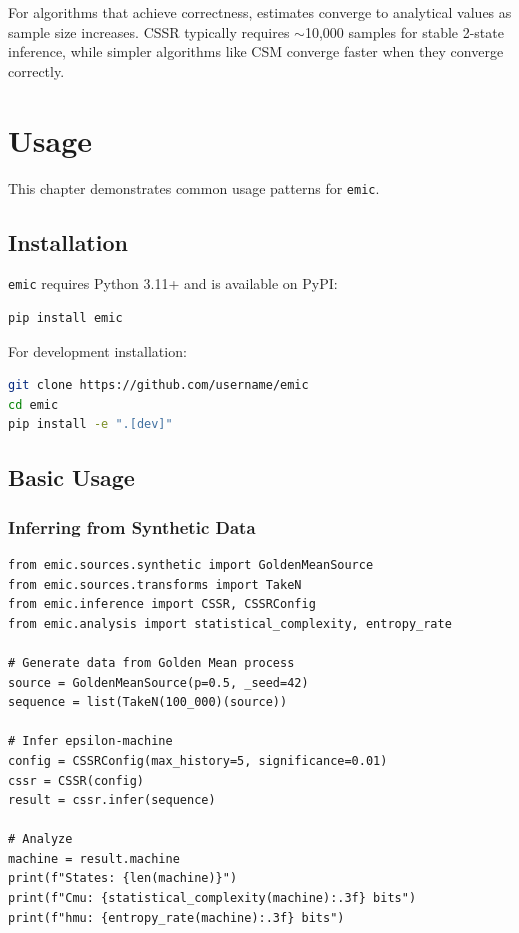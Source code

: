 \documentclass[11pt,a4paper]{report}
\theoremstyle{definition}
\theoremstyle{plain}
\newcommand{\emic}{\texttt{emic}}
\begin{document}
For algorithms that achieve correctness, estimates converge to analytical values as sample size increases. CSSR typically requires $\sim$10,000 samples for stable 2-state inference, while simpler algorithms like CSM converge faster when they converge correctly.

\chapter{Usage}
\label{ch:usage}

This chapter demonstrates common usage patterns for \emic{}.

\section{Installation}

\emic{} requires Python 3.11+ and is available on PyPI:

\begin{lstlisting}[language=bash]
pip install emic
\end{lstlisting}

For development installation:

\begin{lstlisting}[language=bash]
git clone https://github.com/username/emic
cd emic
pip install -e ".[dev]"
\end{lstlisting}

\section{Basic Usage}

\subsection{Inferring from Synthetic Data}

\begin{lstlisting}[caption={Basic inference example}]
from emic.sources.synthetic import GoldenMeanSource
from emic.sources.transforms import TakeN
from emic.inference import CSSR, CSSRConfig
from emic.analysis import statistical_complexity, entropy_rate

# Generate data from Golden Mean process
source = GoldenMeanSource(p=0.5, _seed=42)
sequence = list(TakeN(100_000)(source))

# Infer epsilon-machine
config = CSSRConfig(max_history=5, significance=0.01)
cssr = CSSR(config)
result = cssr.infer(sequence)

# Analyze
machine = result.machine
print(f"States: {len(machine)}")
print(f"Cmu: {statistical_complexity(machine):.3f} bits")
print(f"hmu: {entropy_rate(machine):.3f} bits")
\end{lstlisting}
\end{document}
